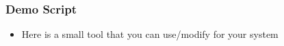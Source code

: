 \begin{frame}
	\frametitle{Demo Script}
	\begin{itemize}
		\item Here is a small tool that you can use/modify for your system
	\end{itemize}
\end{frame}
